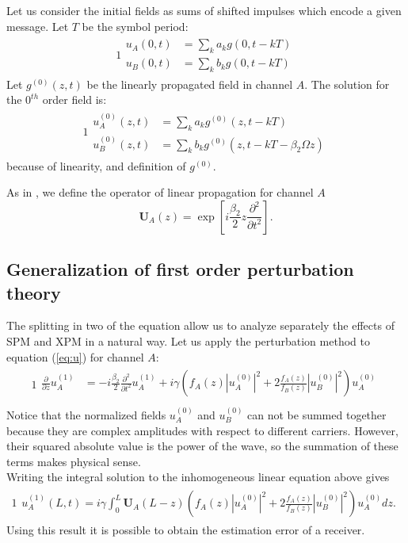 \documentclass[10pt, lettersize, journal, onecolumn]{IEEEtran}
\begin{document}
Let us consider the initial fields as sums of shifted impulses which encode a given message. Let $T$ be the symbol period:
\begin{alignat}{1}
 \begin{aligned}
   u_A(0, t) &= \sum_{k}a_k g(0, t-kT)\\
   u_B(0, t) &= \sum_{k}b_k g(0, t-kT)
 \end{aligned}
\end{alignat}
%
Let $g^{(0)}(z, t)$ be the linearly propagated field in channel $A$.
The solution for the $0^{th}$ order field is:
\begin{alignat}{1}
 \begin{aligned}\label{eq:modulation}
   u_A^{(0)}(z, t) &= \sum_{k}a_k g^{(0)}(z, t-kT)\\
   u_B^{(0)}(z, t) &= \sum_{k}b_k g^{(0)}(z, t-kT - \beta_2 \Omega z)
 \end{aligned}
\end{alignat}
because of linearity, and definition of $g^{(0)}$.

As in \cite{Dar_2013}, we define the operator of linear propagation for channel $A$
\begin{equation}
	\mathbf{U}_A(z) = \exp\left[i \frac{\beta_2}{2} z \frac{\partial^2}{\partial t^2}\right].
\end{equation}

\subsection{Generalization of first order perturbation theory}
The splitting in two of the equation allow us to analyze separately the effects of SPM and XPM in a natural way.
Let us apply the perturbation method to equation  (\ref{eq:u}) for channel $A$:
\begin{alignat}{1}
 \begin{aligned}
 \frac{\partial}{\partial z} u_A^{(1)} &= -  i \frac{\beta_2}{2} \frac{\partial^2}{\partial t^2} u_A^{(1)} + i \gamma \left(f_A(z)|u_A^{(0)}|^2 + 2 \frac{f_A(z)}{f_B(z)} |u_B^{(0)}|^2 \right)u_A^{(0)} \\
 \end{aligned}
\end{alignat} \label{eq:perturbation}
Notice that the normalized fields $u^{(0)}_A$ and $u^{(0)}_B$ can not be summed together because they are complex amplitudes with respect to different carriers. However, their squared absolute value is the power of the wave, so the summation of these terms makes physical sense.\\
Writing the integral solution to the inhomogeneous linear equation above gives
\begin{alignat}{1}
 \begin{aligned}
 u_A^{(1)}(L, t) = i\gamma \int_0^L \mathbf{U}_A(L-z)\left(f_A(z)|u_A^{(0)}|^2 + 2 \frac{f_A(z)}{f_B(z)} |u_B^{(0)}|^2 \right)u_A^{(0)} dz.
 \end{aligned}\label{eq:solution}
\end{alignat} 
Using this result it is possible to obtain the estimation error of a receiver.
\end{document}
